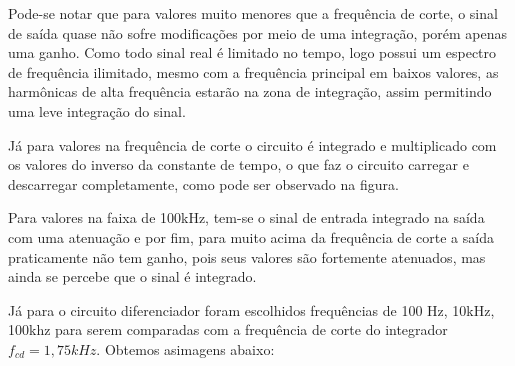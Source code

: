 Pode-se notar que para valores muito menores que a frequência de corte, o sinal de saída quase não sofre modificações por meio de uma integração, porém apenas uma ganho. Como todo sinal real é limitado no tempo, logo possui um espectro de frequência ilimitado, mesmo com a frequência principal em baixos valores, as harmônicas de alta frequência estarão na zona de integração, assim permitindo uma leve integração do sinal.

Já para valores na frequência de corte o circuito é integrado e multiplicado com os valores do inverso da constante de tempo, o que faz o circuito carregar e descarregar completamente, como pode ser observado na figura.

Para valores na faixa de 100kHz, tem-se o sinal de entrada integrado na saída com uma atenuação e por fim, para muito acima da frequência de corte a saída praticamente não tem ganho, pois seus valores são fortemente atenuados, mas ainda se percebe que o sinal é integrado.

Já para o circuito diferenciador foram escolhidos frequências de 100 Hz, 10kHz, 100khz para serem comparadas com a frequência de corte do integrador $f_{cd} = 1,75 kHz$. Obtemos asimagens abaixo:

